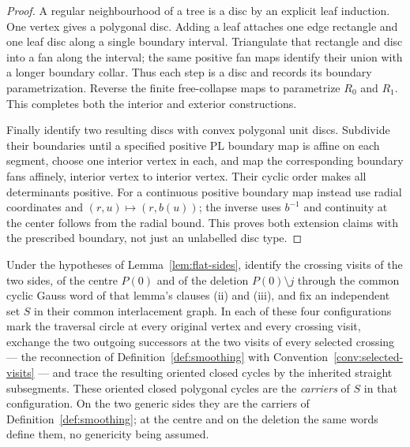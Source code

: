 \begin{proof}
A regular neighbourhood of a tree is a disc by an explicit leaf
induction. One vertex gives a polygonal disc. Adding a leaf attaches
one edge rectangle and one leaf disc along a single boundary interval.
Triangulate that rectangle and disc into a fan along the interval; the
same positive fan maps identify their union with a longer boundary
collar. Thus each step is a disc and records its boundary parametrization.
Reverse the finite free-collapse maps to parametrize $R_0$ and $R_1$.
This completes both the interior and exterior constructions.

Finally identify two resulting discs with convex polygonal unit discs.
Subdivide their boundaries until a specified positive PL boundary map
is affine on each segment, choose one interior vertex in each, and map
the corresponding boundary fans affinely, interior vertex to interior
vertex. Their cyclic order makes all determinants positive. For a
continuous positive boundary map instead use radial coordinates and
$(r,u)\mapsto(r,b(u))$; the inverse uses $b^{-1}$ and continuity at
the center follows from the radial bound. This proves both extension
claims with the prescribed boundary, not just an unlabelled disc type.
\end{proof}

\begin{definition}\label{def:flat-carriers}\leanok{}
Under the hypotheses of Lemma~\ref{lem:flat-sides}, identify the crossing
visits of the two sides, of the centre $P(0)$ and of the deletion
$P(0)\setminus j$ through the common cyclic Gauss word of that lemma's
clauses (ii) and (iii), and fix an independent set $S$ in their common
interlacement graph. In each of these four configurations mark the
traversal circle at every original vertex and every crossing visit,
exchange the two outgoing successors at the two visits of every selected
crossing --- the reconnection of Definition~\ref{def:smoothing} with
Convention~\ref{conv:selected-visits} --- and trace the resulting oriented
closed cycles by the inherited straight subsegments. These oriented closed
polygonal cycles are the \emph{carriers} of $S$ in that configuration. On
the two generic sides they are the carriers of
Definition~\ref{def:smoothing}; at the centre and on the deletion the same
words define them, no genericity being assumed.
\end{definition}

